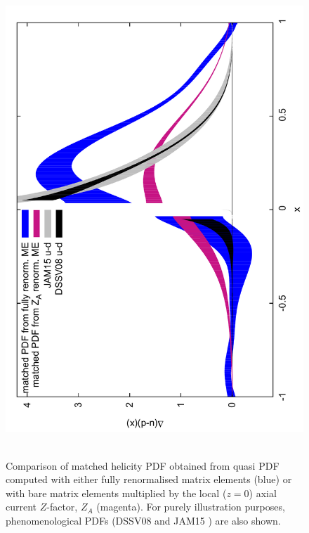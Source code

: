 \begin{figure}[t]
\centering
\includegraphics[scale=0.4,angle=-90]{plots/qmatched_bare_vs_fit69v2}\,\,\,
\vspace*{-0.3cm}
\begin{minipage}{15cm}
\hspace*{3cm}
\caption{\small Comparison of matched helicity PDF obtained from quasi PDF computed with either fully renormalised matrix elements (blue) 
or with bare matrix elements multiplied by the local ($z{=}0$) axial current $Z$-factor, $Z_A$ (magenta). For purely illustration purposes, 
phenomenological PDFs (DSSV08 \cite{deFlorian:2009vb} and JAM15 \cite{Sato:2016tuz}) are also shown.}
\label{fig:matched} 
\end{minipage}
\end{figure}
